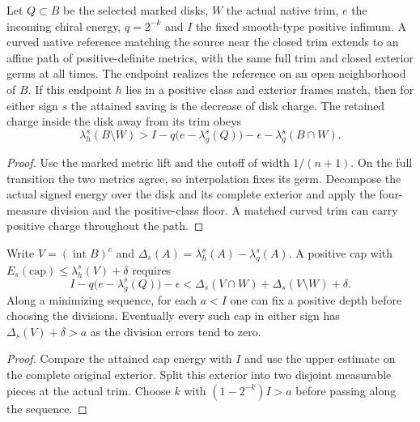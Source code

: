 \begin{theorem}
\label{thm:ed03-matched-curved}
\leanok
Let $Q\subset B$ be the selected marked disks, $W$ the actual native trim,
$e$ the incoming chiral energy, $q=2^{-k}$ and $I$ the fixed smooth-type
positive infimum. A curved native reference matching the source near the
closed trim extends to an affine path of positive-definite metrics, with
the same full trim and closed exterior germs at all times. The endpoint
realizes the reference on an open neighborhood of $B$. If this endpoint
$h$ lies in a positive class and exterior frames match, then for either
sign $s$ the attained saving is the decrease of disk charge. The retained
charge inside the disk away from its trim obeys
\[
 \lambda_h^s(B\setminus W)>
 I-q\bigl(e-\lambda_g^s(Q)\bigr)-\epsilon-\lambda_g^s(B\cap W).
\]
\end{theorem}
\begin{proof}
\leanok
Use the marked metric lift and the cutoff of width $1/(n+1)$.
On the full transition the two metrics agree, so interpolation fixes its
germ. Decompose the actual signed energy over the disk and its complete
exterior and apply the four-measure division and the positive-class floor.
A matched curved trim can carry positive charge throughout the path.
\end{proof}

\begin{proposition}
\label{prop:ed03-curved-cap-price}
\leanok
Write $V=(\operatorname{int} B)^c$ and
$\Delta_s(A)=\lambda_h^s(A)-\lambda_g^s(A)$. A positive cap with
$E_s(\mathrm{cap})\le\lambda_h^s(V)+\delta$ requires
\[
 I-q\bigl(e-\lambda_g^s(Q)\bigr)-\epsilon
 < \Delta_s(V\cap W)+\Delta_s(V\setminus W)+\delta .
\]
Along a minimizing sequence, for each $a<I$ one can fix a positive depth
before choosing the divisions. Eventually every such cap in either sign
has $\Delta_s(V)+\delta>a$ as the division errors tend to zero.
\end{proposition}
\begin{proof}
\leanok
Compare the attained cap energy with $I$ and use the upper estimate
on the complete original exterior. Split this exterior into two disjoint
measurable pieces at the actual trim. Choose $k$ with
$(1-2^{-k})I>a$ before passing along the sequence.
\end{proof}

